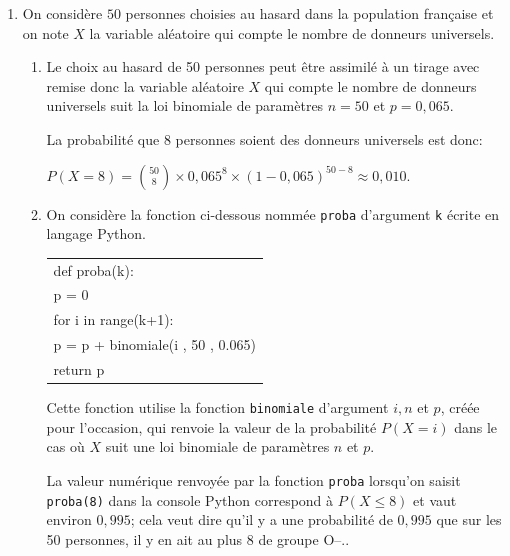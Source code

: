 \begin{enumerate}
\item On considère $50$ personnes choisies au hasard dans la population française et on note $X$ la variable aléatoire qui compte le nombre de donneurs universels.
	\begin{enumerate}
		\item %
Le choix au hasard de 50 personnes peut être assimilé à un tirage avec remise donc la variable aléatoire $X$ qui compte le nombre de donneurs universels suit la loi binomiale de paramètres $n=50$ et $p=0,065$.

La probabilité que 8 personnes soient des donneurs universels est donc:

$P\left( X=8\right ) = \displaystyle\binom{50}{8}\times 0,065^{8}\times \left (1-0,065\right )^{50-8} \approx 0,010$.

		\item On considère la fonction ci-dessous nommée \texttt{proba} d'argument \texttt{k} écrite en langage Python.
		
\begin{center}
\ttfamily
\begin{tabular}{|l|}
\hline
def proba(k):\\
\quad p = 0\\
\quad for i in range(k+1):\\
\quad \quad p = p + binomiale(i , 50 , 0.065)\\ 
\quad return p\\ 
\hline
\end{tabular}
\end{center}

Cette fonction utilise la fonction \texttt{binomiale} d'argument $i, n$ et $p$, créée pour l'occasion, qui renvoie la valeur de la probabilité $P(X = i)$ dans le cas où $X$ suit une loi binomiale de paramètres $n$ et $p$.


La valeur numérique renvoyée par la fonction \texttt{proba} lorsqu'on saisit \texttt{proba(8)} dans la console Python correspond à $P\left ( X\leqslant 8 \right )$ et vaut environ $0,995$; cela veut dire qu'il y a une probabilité de $0,995$ que sur les 50 personnes, il y en ait au plus 8 de groupe O--..
	\end{enumerate}
	

\end{enumerate}
